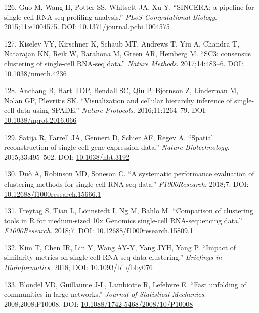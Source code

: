 \documentclass[11pt,a4paper,titlepage,twoside,openright]{style/unimelbthesis}
\theoremstyle{definition}
\theoremstyle{definition}
\theoremstyle{definition}
\theoremstyle{remark}
\begin{document}
\begin{mainmatter}
\leavevmode\hypertarget{ref-Guo2015-mf}{}%
126. Guo M, Wang H, Potter SS, Whitsett JA, Xu Y. ``SINCERA: a pipeline for single-cell RNA-seq profiling analysis.'' \emph{PLoS Computational Biology}. 2015;11:e1004575. DOI: \href{https://doi.org/10.1371/journal.pcbi.1004575}{10.1371/journal.pcbi.1004575}

\leavevmode\hypertarget{ref-Kiselev2017-an}{}%
127. Kiselev VY, Kirschner K, Schaub MT, Andrews T, Yiu A, Chandra T, Natarajan KN, Reik W, Barahona M, Green AR, Hemberg M. ``SC3: consensus clustering of single-cell RNA-seq data.'' \emph{Nature Methods}. 2017;14:483--6. DOI: \href{https://doi.org/10.1038/nmeth.4236}{10.1038/nmeth.4236}

\leavevmode\hypertarget{ref-Anchang2016-vo}{}%
128. Anchang B, Hart TDP, Bendall SC, Qiu P, Bjornson Z, Linderman M, Nolan GP, Plevritis SK. ``Visualization and cellular hierarchy inference of single-cell data using SPADE.'' \emph{Nature Protocols}. 2016;11:1264--79. DOI: \href{https://doi.org/10.1038/nprot.2016.066}{10.1038/nprot.2016.066}

\leavevmode\hypertarget{ref-Satija2015-or}{}%
129. Satija R, Farrell JA, Gennert D, Schier AF, Regev A. ``Spatial reconstruction of single-cell gene expression data.'' \emph{Nature Biotechnology}. 2015;33:495--502. DOI: \href{https://doi.org/10.1038/nbt.3192}{10.1038/nbt.3192}

\leavevmode\hypertarget{ref-Duo2018-qb}{}%
130. Duò A, Robinson MD, Soneson C. ``A systematic performance evaluation of clustering methods for single-cell RNA-seq data.'' \emph{F1000Research}. 2018;7. DOI: \href{https://doi.org/10.12688/f1000research.15666.1}{10.12688/f1000research.15666.1}

\leavevmode\hypertarget{ref-Freytag2018-ic}{}%
131. Freytag S, Tian L, Lönnstedt I, Ng M, Bahlo M. ``Comparison of clustering tools in R for medium-sized 10x Genomics single-cell RNA-sequencing data.'' \emph{F1000Research}. 2018;7. DOI: \href{https://doi.org/10.12688/f1000research.15809.1}{10.12688/f1000research.15809.1}

\leavevmode\hypertarget{ref-Kim2018-xn}{}%
132. Kim T, Chen IR, Lin Y, Wang AY-Y, Yang JYH, Yang P. ``Impact of similarity metrics on single-cell RNA-seq data clustering.'' \emph{Briefings in Bioinformatics}. 2018; DOI: \href{https://doi.org/10.1093/bib/bby076}{10.1093/bib/bby076}

\leavevmode\hypertarget{ref-Blondel2008-ym}{}%
133. Blondel VD, Guillaume J-L, Lambiotte R, Lefebvre E. ``Fast unfolding of communities in large networks.'' \emph{Journal of Statistical Mechanics}. 2008;2008:P10008. DOI: \href{https://doi.org/10.1088/1742-5468/2008/10/P10008}{10.1088/1742-5468/2008/10/P10008}


\end{mainmatter}
\end{document}
